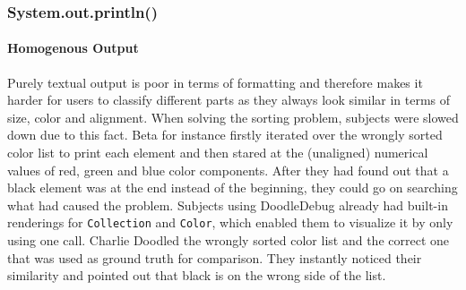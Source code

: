 \documentclass[english]{acm_proc_article-sp}
\begin{document}
\subsubsection{System.out.println()}
\paragraph{Homogenous Output}
Purely textual output is poor in terms of formatting and therefore makes it harder for users to classify different parts as they always look similar in terms of size, color and alignment. 
When solving the sorting problem, subjects were slowed down due to this fact. 
Beta for instance firstly iterated over the wrongly sorted color list to print each element and then stared at the (unaligned) numerical values of red, green and blue color components. 
After they had found out that a black element was at the end instead of the beginning, they could go on searching what had caused the problem. 
Subjects using DoodleDebug already had built-in renderings for \texttt{Collection}  and \texttt{Color}, which enabled them to visualize it by only using one call. 
Charlie Doodled the wrongly sorted color list and the correct one that was used as ground truth for comparison. 
They instantly noticed their similarity and pointed out that black is on the wrong side of the list.
\end{document}
